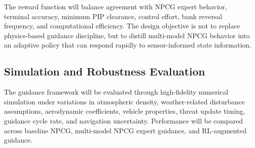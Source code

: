 The reward function will balance agreement with NPCG expert behavior, terminal accuracy, minimum PIP clearance, control effort, bank reversal frequency, and computational efficiency. The design objective is not to replace physics-based guidance discipline, but to distill multi-model NPCG behavior into an adaptive policy that can respond rapidly to sensor-informed state information.

\subsection{Simulation and Robustness Evaluation}

The guidance framework will be evaluated through high-fidelity numerical simulation under variations in atmospheric density, weather-related disturbance assumptions, aerodynamic coefficients, vehicle properties, threat update timing, guidance cycle rate, and navigation uncertainty. Performance will be compared across baseline NPCG, multi-model NPCG expert guidance, and RL-augmented guidance.
